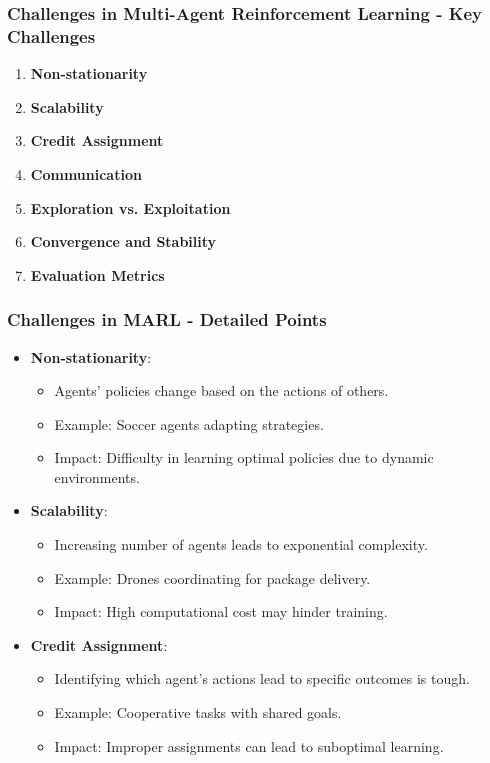 \documentclass[aspectratio=169]{beamer}
\begin{document}
\begin{frame}[fragile]
    \frametitle{Challenges in Multi-Agent Reinforcement Learning - Key Challenges}
    \begin{enumerate}
        \item \textbf{Non-stationarity}
        \item \textbf{Scalability}
        \item \textbf{Credit Assignment}
        \item \textbf{Communication}
        \item \textbf{Exploration vs. Exploitation}
        \item \textbf{Convergence and Stability}
        \item \textbf{Evaluation Metrics}
    \end{enumerate}
\end{frame}

\begin{frame}[fragile]
    \frametitle{Challenges in MARL - Detailed Points}
    \begin{itemize}
        \item \textbf{Non-stationarity}:
        \begin{itemize}
            \item Agents' policies change based on the actions of others.
            \item Example: Soccer agents adapting strategies.
            \item Impact: Difficulty in learning optimal policies due to dynamic environments.
        \end{itemize}
        
        \item \textbf{Scalability}:
        \begin{itemize}
            \item Increasing number of agents leads to exponential complexity.
            \item Example: Drones coordinating for package delivery.
            \item Impact: High computational cost may hinder training.
        \end{itemize}
        
        \item \textbf{Credit Assignment}:
        \begin{itemize}
            \item Identifying which agent's actions lead to specific outcomes is tough.
            \item Example: Cooperative tasks with shared goals.
            \item Impact: Improper assignments can lead to suboptimal learning.
        \end{itemize}
    \end{itemize}
\end{frame}
\end{document}
